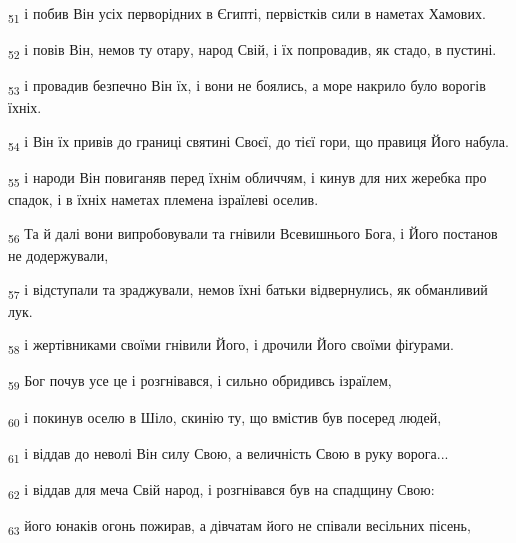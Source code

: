 \begin{tcolorbox}
\textsubscript{51} і побив Він усіх перворідних в Єгипті, первістків сили в наметах Хамових.
\end{tcolorbox}
\begin{tcolorbox}
\textsubscript{52} і повів Він, немов ту отару, народ Свій, і їх попровадив, як стадо, в пустині.
\end{tcolorbox}
\begin{tcolorbox}
\textsubscript{53} і провадив безпечно Він їх, і вони не боялись, а море накрило було ворогів їхніх.
\end{tcolorbox}
\begin{tcolorbox}
\textsubscript{54} і Він їх привів до границі святині Своєї, до тієї гори, що правиця Його набула.
\end{tcolorbox}
\begin{tcolorbox}
\textsubscript{55} і народи Він повиганяв перед їхнім обличчям, і кинув для них жеребка про спадок, і в їхніх наметах племена ізраїлеві оселив.
\end{tcolorbox}
\begin{tcolorbox}
\textsubscript{56} Та й далі вони випробовували та гнівили Всевишнього Бога, і Його постанов не додержували,
\end{tcolorbox}
\begin{tcolorbox}
\textsubscript{57} і відступали та зраджували, немов їхні батьки відвернулись, як обманливий лук.
\end{tcolorbox}
\begin{tcolorbox}
\textsubscript{58} і жертівниками своїми гнівили Його, і дрочили Його своїми фіґурами.
\end{tcolorbox}
\begin{tcolorbox}
\textsubscript{59} Бог почув усе це і розгнівався, і сильно обридивсь ізраїлем,
\end{tcolorbox}
\begin{tcolorbox}
\textsubscript{60} і покинув оселю в Шіло, скинію ту, що вмістив був посеред людей,
\end{tcolorbox}
\begin{tcolorbox}
\textsubscript{61} і віддав до неволі Він силу Свою, а величність Свою в руку ворога...
\end{tcolorbox}
\begin{tcolorbox}
\textsubscript{62} і віддав для меча Свій народ, і розгнівався був на спадщину Свою:
\end{tcolorbox}
\begin{tcolorbox}
\textsubscript{63} його юнаків огонь пожирав, а дівчатам його не співали весільних пісень,
\end{tcolorbox}
